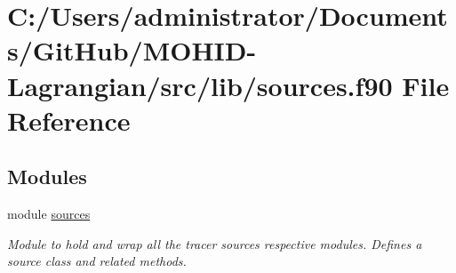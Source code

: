 \hypertarget{sources_8f90}{}\section{C\+:/\+Users/administrator/\+Documents/\+Git\+Hub/\+M\+O\+H\+I\+D-\/\+Lagrangian/src/lib/sources.f90 File Reference}
\label{sources_8f90}
\subsection*{Modules}
\begin{DoxyCompactItemize}
\item 
module \hyperlink{namespacesources}{sources}
\begin{DoxyCompactList}\small\item\em Module to hold and wrap all the tracer sources respective modules. Defines a source class and related methods. \end{DoxyCompactList}\end{DoxyCompactItemize}
